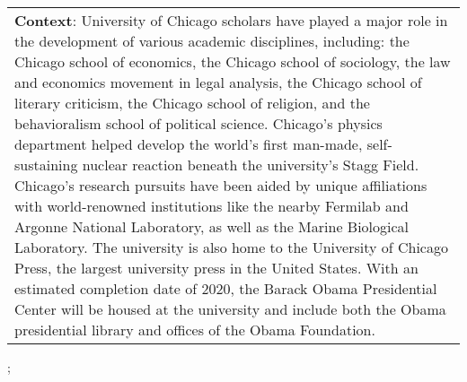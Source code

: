 \begin{figure*}[ht]
{\begin{tabular}{p{}}
            \textbf{Context}: University of Chicago scholars have played a major role in the development of various academic disciplines, including: the Chicago school of economics, the Chicago school of sociology, the law and economics movement in legal analysis, the Chicago school of literary criticism, the Chicago school of religion, and the behavioralism school of political science. Chicago's physics department helped develop the world's first man-made, self-sustaining nuclear reaction beneath the university's Stagg Field. Chicago's research pursuits have been aided by unique affiliations with world-renowned institutions like the nearby Fermilab and Argonne National Laboratory, as well as the Marine Biological Laboratory. The university is also home to the University of Chicago Press, the largest university press in the United States. With an estimated completion date of 2020, the Barack Obama Presidential Center will be housed at the university and include both the Obama presidential library and offices of the Obama Foundation. \\
        \end{tabular}
    };
    \label{fig:ex-5acf782877cf76001a684eb4}
\end{figure*}

